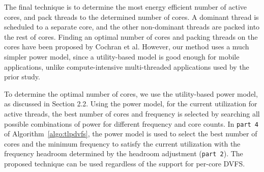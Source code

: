 The final technique is to determine the most energy efficient number of active
cores, and pack threads to the determined number of cores. A dominant thread is
scheduled to a separate core, and the other non-dominant threads are packed 
into the rest of cores. 
Finding an optimal number of cores and packing threads on the cores have been
proposed by Cochran et al. \cite{packandcap}  However, our method uses 
a much simpler power model, since a utility-based model is good enough for
mobile applications, unlike compute-intensive multi-threaded applications used
by the prior study.

To determine the optimal number of cores, we use the utility-based power model, as discussed
in Section 2.2. Using the power model, for the current utilization for active threads,
the best number of cores and frequency is selected by searching all possible combinations
of power for different frequency and core counts. In {\tt part 4} of Algorithm~\ref{algo:tlpdvfs},
the power model is used to select the best number of cores and the minimum frequency 
to satisfy the current utilization with the frequency headroom determined by the headroom
adjustment ({\tt part 2}).
The proposed technique can be used regardless of the support for per-core DVFS. 

